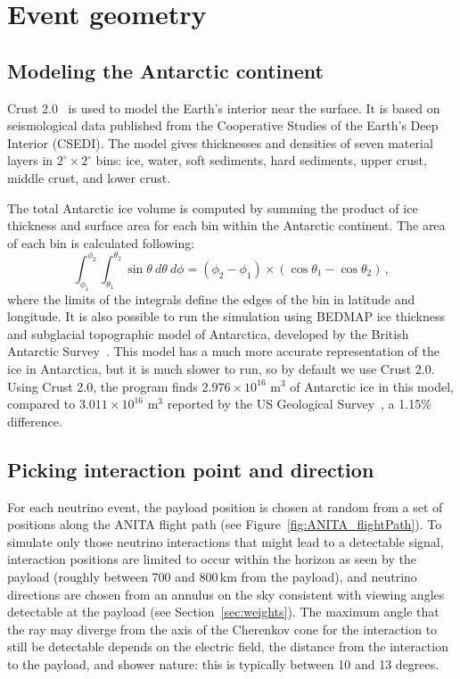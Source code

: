 \section{Event geometry}
\label{sec:eventGeometry}

\subsection{Modeling the Antarctic continent}
Crust 2.0~\cite{crust2} is used to model the Earth's interior near the 
surface.  It is based on seismological data published from the Cooperative Studies of the Earth's Deep Interior (CSEDI).
The model gives thicknesses and densities of seven material
layers in $2^{\circ} \times 2^{\circ}$ bins:  ice, water, soft sediments, hard sediments, upper crust,
middle crust, and lower crust.  

The total Antarctic ice volume is computed by summing the product of ice
thickness and surface area for each bin within the Antarctic continent.
The area of each bin is calculated following:
\begin{equation}
\int_{\phi_1}^{\phi_2}\int_{\theta_1}^{\theta_2}\sin{\theta}~d\theta~d\phi=\left(\phi_2-\phi_1\right)\times\left(\cos{\theta_1}-\cos{\theta_2}\right) \, ,
\end{equation}
\noindent where the limits of the integrals define the edges of the bin in
latitude and longitude.
It is also possible to run the simulation using BEDMAP ice thickness
and subglacial topographic model of Antarctica, developed by the
British Antarctic Survey~\cite{bedmap}.
This model has a much more accurate representation of the ice in
Antarctica, but it is much slower to run, so by default we use
Crust 2.0.
Using Crust 2.0, the \icemc program finds $2.976 \times 10^{16}$ m$^3$ of Antarctic ice in this model, compared to $3.011 \times 10^{16}$ m$^3$ reported by the US Geological Survey~\cite{usgs}, a 1.15\% difference.

\subsection{Picking interaction point and direction}
\label{sec:pickneutrino}

For each neutrino event, the payload position is chosen at random from a set of positions along the ANITA flight path (see Figure~\ref{fig:ANITA_flightPath}).
To simulate only those neutrino interactions that might lead to a detectable signal, interaction positions are limited to occur within the horizon as seen by the payload (roughly between 700 and 800\,km from the payload), and neutrino directions are chosen from an annulus on the sky consistent with viewing angles detectable at the payload (see Section~\ref{sec:weights}). 
The maximum angle that the ray may diverge from the axis of the Cherenkov cone for the interaction to still be detectable depends on the electric field, the distance from the interaction to the payload, and shower nature: this is typically between 10 and 13 degrees.

